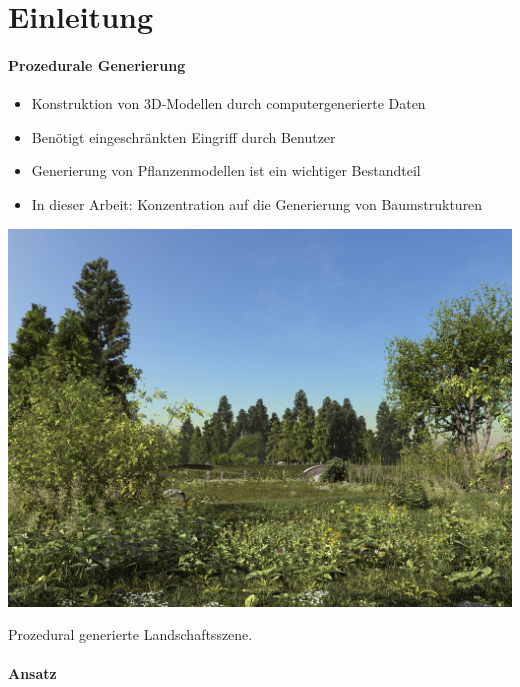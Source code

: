 \newpage
{}
\section{Einleitung \\}
\paragraph{Prozedurale Generierung\\}
\begin{itemize}
	\item Konstruktion von 3D-Modellen durch computergenerierte Daten
	\item Benötigt eingeschränkten Eingriff durch Benutzer
	\item Generierung von Pflanzenmodellen ist ein wichtiger Bestandteil
	\item In dieser Arbeit: Konzentration auf die Generierung von Baumstrukturen
\end{itemize}

\newpage
{}
\begin{center}
	\includegraphics[height=.9\textheight]{images/greenXfrog_JanWalterSchliep.jpg}	
	
	Prozedural generierte Landschaftsszene. \cite{GreenOne:16}
\end{center}

\newpage
{}
\paragraph{Ansatz\\}

